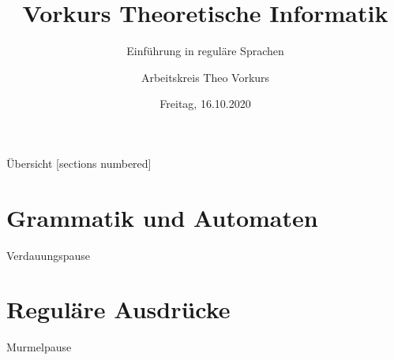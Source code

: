

\title{Vorkurs Theoretische Informatik}
\subtitle{Einführung in reguläre Sprachen}
\date{Freitag, 16.10.2020}
\author{Arbeitskreis  Theo Vorkurs}



\maketitle

\begin{frame}[fragile]{Übersicht}
  [sections numbered]
  \tableofcontents%
\end{frame}


\section{Grammatik und Automaten}



\begin{frame}[standout]
  Verdauungspause
\end{frame}

\section{Reguläre Ausdrücke}



\begin{frame}[standout]
  Murmelpause
\end{frame}

